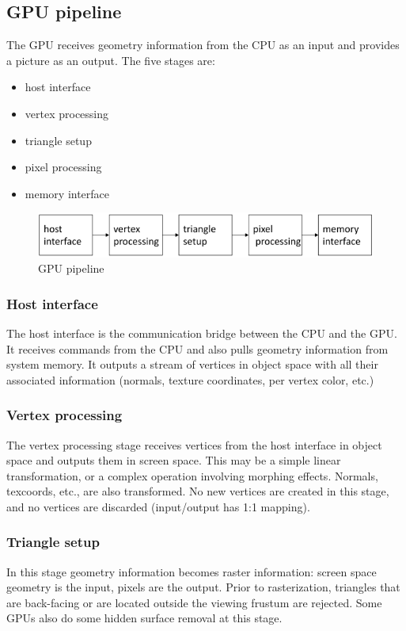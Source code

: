 \subsection{GPU pipeline}\label{subsec:gpu-pipeline}
The GPU receives geometry information from the CPU as an input and provides a picture as an output.
The five stages are:
\begin{itemize}
    \item host interface
    \item vertex processing
    \item triangle setup
    \item pixel processing
    \item memory interface
\end{itemize}

\begin{figure}[h]
    \centering
    \includegraphics[width=\linewidth]{images/gpu-pipeline}
    \caption{GPU pipeline}
    \label{fig:gpu-pipeline}
\end{figure}

\subsubsection{Host interface}
The host interface is the communication bridge between the CPU and the GPU\@.
It receives commands from the CPU and also pulls geometry information from system memory.
It outputs a stream of vertices in object space with all their associated information (normals, texture
coordinates, per vertex color, etc.)

\subsubsection{Vertex processing}
The vertex processing stage receives vertices from the host interface in object space and outputs them in screen space.
This may be a simple linear transformation, or a complex operation involving morphing effects.
Normals, texcoords, etc., are also transformed.
No new vertices are created in this stage, and no vertices are discarded (input/output has 1:1 mapping).

\subsubsection{Triangle setup}
In this stage geometry information becomes raster information: screen space geometry is the input, pixels are the 
output.
Prior to rasterization, triangles that are back-facing or are located outside the viewing frustum are rejected.
Some GPUs also do some hidden surface removal at this stage.

